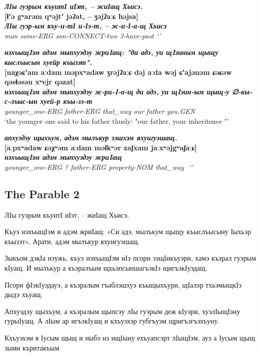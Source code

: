\documentclass[a4paper,12pt]{book}
\newcommand{\1}[1]{\textbf{\emph{#1}}} %
\newcommand{\2}[1]{\textbf{[#1]}} %
\newcommand{\3}[1]{\fontsize{11pt}{0cm}\textbf{\emph{#1}}} %
\newcommand{\4}[1]{\fontsize{10pt}{0cm}\emph{#1}}	%
\newcommand{\5}[1]{\textbf{/#1/}} %
\newcommand{\6}[1]{\textbf{[#1]}} %
\newcommand{\7}[1]{\fontsize{12pt}{0cm}\emph{#1}} %
\newcommand{\8}[1]{\fontsize{12pt}{0cm}`#1'} %
\newcommand{\9}[1]{\fontsize{12pt}{0cm}(lit. `#1')} %
\begin{document}
\begin{exe}
\ex
\1{ЛӀы гуэрым къуитӀ иӀэт, – жиӀащ Хьисэ.}\\
\2{ɬʼə gʷarəm qʷəjtʼ jəʔat, – ʒəjʔaːɕ ħəjsa}\\
\3{ЛӀы гуэр-ым къу-и-тӀ и-Ӏэ-т, – ж-и-Ӏ-а-щ Хьисэ}\\
\4{man some-ERG son-CONNECT-two 3-have-past}\
\trans \8{}

\ex
\1{нэхъыщIэм адэм мыпхуэдэу жриIащ: "ди адэ, уи щIэиным щыщу кыслъысын хуейр къызэт". }\\
\2{naχəɕʼam aːdam məpxʷadaw ʒrəjʔaːɕ dəj aːda wəj ɕʼajənəm ɕəɕəw qəsɬəsən xʷejr qəzat}\\
\3{нэхъыщIэм адэм мыпхуэдэу ж-ри-I-а-щ ди адэ, уи щIэин-ым щыщ-у ∅-кы-с-лъыс-ын хуей-р къы-зэ-т}\\
\4{younger_one-ERG father-ERG that_way our father you.GEN}\\
\trans \8{the younger one said to his father thusly: "our father, your inheritence "}

\ex
\1{апхуэдэу щыхъум, адэм мылъкур зэшхэм яхуигуэшащ.}\\
\2{aːpxʷadaw ɕəχʷəm aːdam məɬkʷər zaʃxam jaːxʷəjgʷaʃaːɕ}\\
\3{нэхъыщIэм адэм мыпхуэдэу жриIащ}\\
\4{younger\_one-ERG ? father-ERG property-NOM that\_way }\
\trans \8{}
\end{exe}



\subsection{The Parable 2}
ЛӀы гуэрым къуитӀ иӀэт, – жиӀащ Хьисэ. 

Къуэ нэхъыщӀэм и адэм жриӀащ: «Си адэ, мылъкум щыщу къыслъысыну Ӏыхьэр къызэт». Арати, адэм мылъкур яхуигуэшащ.

Зыкъом дэкӀа нэужь, къуэ нэхъыщӀэм иӀэ псори зэщӀикъуэри, хамэ къэрал гуэрым кӀуащ. И мылъкур а къэралъым щхьэпсыншагъэкӀэ щигъэкӀуэдащ. 

Псори фӀэкӀуэдауэ, а къэралым гъаблэшхуэ къыщыхъури, щӀалэр тхьэмыщкӀэ дыдэ хъуащ. 

Апхуэдэу щыхъум, а къэралым щыпсэу лӀы гуэрым деж кӀуэри, хуэлӀыщӀэну гурыӀуащ. А лӀым ар игъэкӀуащ и кхъуэхэр губгъуэм щригъэгъэхъуну.

Кхъуэхэм я Ӏусым щыщ и ныбэ из ищӀыну ехъуапсэрт лӀыщӀэм, ауэ а Ӏусым щыщ зыми къритакъым
\end{document}
